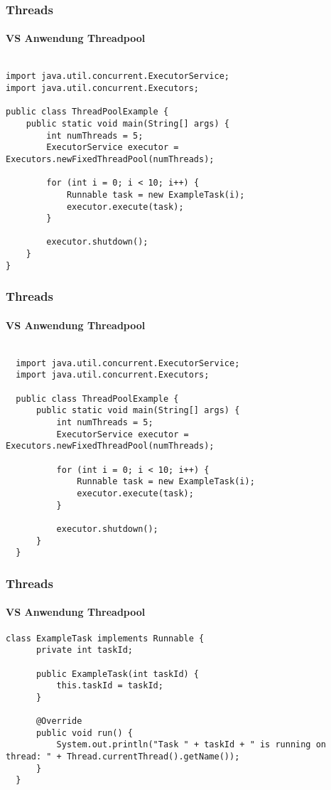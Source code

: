 \begin{frame}[fragile]
  \frametitle{Threads}
  \framesubtitle{VS Anwendung Threadpool}
\begin{lstlisting}[caption={ExecutorService-Klasse I},captionpos=b,label={lst:executorI}]

import java.util.concurrent.ExecutorService;
import java.util.concurrent.Executors;

public class ThreadPoolExample {
    public static void main(String[] args) {
        int numThreads = 5;
        ExecutorService executor = Executors.newFixedThreadPool(numThreads);

        for (int i = 0; i < 10; i++) {
            Runnable task = new ExampleTask(i);
            executor.execute(task);
        }

        executor.shutdown();
    }
}
\end{lstlisting}
\end{frame}

\begin{frame}[fragile]
  \frametitle{Threads}
  \framesubtitle{VS Anwendung Threadpool}
  \begin{lstlisting}[caption={ExecutorService-Klasse II},captionpos=b,label={lst:executorII}]

  import java.util.concurrent.ExecutorService;
  import java.util.concurrent.Executors;

  public class ThreadPoolExample {
      public static void main(String[] args) {
          int numThreads = 5;
          ExecutorService executor = Executors.newFixedThreadPool(numThreads);

          for (int i = 0; i < 10; i++) {
              Runnable task = new ExampleTask(i);
              executor.execute(task);
          }

          executor.shutdown();
      }
  }

\end{lstlisting}
\end{frame}

\begin{frame}[fragile]
  \frametitle{Threads}
  \framesubtitle{VS Anwendung Threadpool}
  \begin{lstlisting}[caption={ExecutorService-Klasse III},captionpos=b,label={lst:executorIII}]  
  class ExampleTask implements Runnable {
      private int taskId;

      public ExampleTask(int taskId) {
          this.taskId = taskId;
      }

      @Override
      public void run() {
          System.out.println("Task " + taskId + " is running on thread: " + Thread.currentThread().getName());
      }
  }
\end{lstlisting}
\end{frame}

